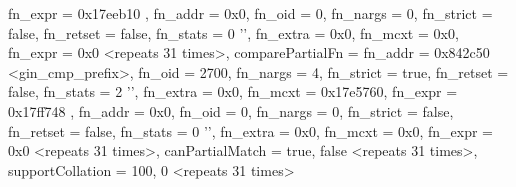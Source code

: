 \documentclass[11pt]{article}
\begin{document}
\begin{oparts}
\begin{textcode}
{{{      fn_expr = 0x17eeb10
    }, {
      fn_addr = 0x0,
      fn_oid = 0,
      fn_nargs = 0,
      fn_strict = false,
      fn_retset = false,
      fn_stats = 0 '',
      fn_extra = 0x0,
      fn_mcxt = 0x0,
      fn_expr = 0x0
    } <repeats 31 times>},
  comparePartialFn = {{
      fn_addr = 0x842c50 <gin_cmp_prefix>,
      fn_oid = 2700,
      fn_nargs = 4,
      fn_strict = true,
      fn_retset = false,
      fn_stats = 2 '',
      fn_extra = 0x0,
      fn_mcxt = 0x17e5760,
      fn_expr = 0x17ff748
    }, {
      fn_addr = 0x0,
      fn_oid = 0,
      fn_nargs = 0,
      fn_strict = false,
      fn_retset = false,
      fn_stats = 0 '',
      fn_extra = 0x0,
      fn_mcxt = 0x0,
      fn_expr = 0x0
    } <repeats 31 times>},
  canPartialMatch = {true, false <repeats 31 times>},
  supportCollation = {100, 0 <repeats 31 times>}
}
\end{textcode}
\end{oparts}
\end{document}
